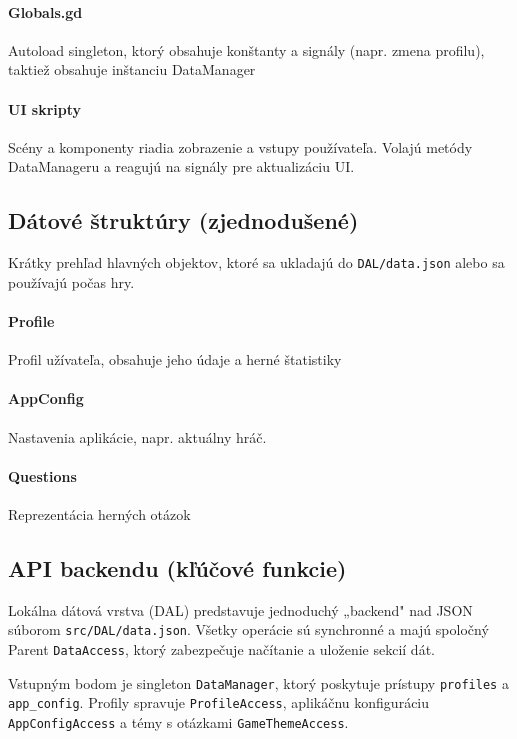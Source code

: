 \documentclass[a4paper,12pt]{article}
\begin{document}
    	\paragraph{Globals.gd}
    	Autoload singleton, ktorý obsahuje konštanty a signály (napr. zmena profilu), taktiež obsahuje inštanciu DataManager 
    	
    	\paragraph{UI skripty}
    	Scény a komponenty riadia zobrazenie a vstupy používateľa. Volajú metódy DataManageru a reagujú na signály pre aktualizáciu UI.
    	
    	
    	\subsection{Dátové štruktúry (zjednodušené)}
    	Krátky prehľad hlavných objektov, ktoré sa ukladajú do \texttt{DAL/data.json} alebo sa používajú počas hry.
    	
    	\paragraph{Profile}
    	Profil užívateľa, obsahuje jeho údaje a herné štatistiky
    	
    	\paragraph{AppConfig}
    	Nastavenia aplikácie, napr. aktuálny hráč.
    	
    	\paragraph{Questions}
    	Reprezentácia herných otázok
    
            \subsection{API backendu (kľúčové funkcie)}
        Lokálna dátová vrstva (DAL) predstavuje jednoduchý „backend" nad JSON súborom \texttt{src/DAL/data.json}. Všetky operácie sú synchronné a majú spoločný Parent \texttt{DataAccess}, ktorý zabezpečuje načítanie a uloženie sekcií dát.
    
        Vstupným bodom je singleton \texttt{DataManager}, ktorý poskytuje prístupy \texttt{profiles} a \texttt{app\_config}. Profily spravuje \texttt{ProfileAccess}, aplikáčnu konfiguráciu \texttt{AppConfigAccess}  a témy s otázkami \texttt{GameThemeAccess}.
    
\end{document}

